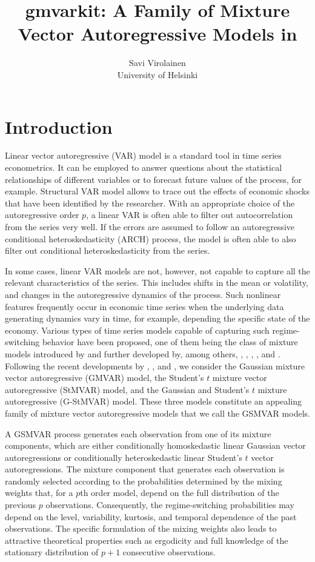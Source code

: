 \documentclass[nojss]{jss} %
\author{Savi Virolainen\\ University of Helsinki}
\title{gmvarkit: A Family of Mixture Vector Autoregressive Models in \proglang{R}}
\begin{document}
\section{Introduction}
Linear vector autoregressive (VAR) model is a standard tool in time series econometrics. It can be employed to answer questions about the statistical relationships of different variables or to forecast future values of the process, for example. Structural VAR model allows to trace out the effects of economic shocks that have been identified by the researcher. With an appropriate choice of the autoregressive order $p$, a linear VAR is often able to filter out autocorrelation from the series very well. If the errors are assumed to follow an autoregressive conditional heteroskedasticity (ARCH) process, the model is often able to also filter out conditional heteroskedasticity from the series.

In some cases, linear VAR models are not, however, not capable to capture all the relevant characteristics of the series. This includes shifts in the mean or volatility, and changes in the autoregressive dynamics of the process. Such nonlinear features frequently occur in economic time series when the underlying data generating dynamics vary in time, for example, depending the specific state of the economy. Various types of time series models capable of capturing such regime-switching behavior have been proposed, one of them being the class of mixture models introduced by \cite{Le+Martin+Raftery:1996} and further developed by, among others, \cite{Kalliovirta+Meitz+Saikkonen:2015}, \cite{Kalliovirta+Meitz+Saikkonen:2015}, \cite{Meitz+Preve+Saikkonen:2021}, \cite{Virolainen:2020}, and \cite{Virolainen:2021, Virolainen2:2021}. Following the recent developments by \cite{Kalliovirta+Meitz+Saikkonen:2016}, \cite{Virolainen:2020}, and \cite{Virolainen2:2021}, we consider the Gaussian mixture vector autoregressive (GMVAR) model, the Student's $t$ mixture vector autoregressive (StMVAR) model, and the Gaussian and Student's $t$ mixture autoregressive (G-StMVAR) model. These three models constitute an appealing family of mixture vector autoregressive models that we call the GSMVAR models.

A GSMVAR process generates each observation from one of its mixture components, which are either conditionally homoskedastic linear Gaussian vector autoregressions or conditionally heteroskedastic linear Student's $t$ vector autoregressions. The mixture component that generates each observation is randomly selected according to the probabilities determined by the mixing weights that, for a $p$th order model, depend on the full distribution of the previous $p$ observations. Consequently, the regime-switching probabilities may depend on the level, variability, kurtosis, and temporal dependence of the past observations. The specific formulation of the mixing weights also leads to attractive theoretical properties such as ergodicity and full knowledge of the stationary distribution of $p+1$ consecutive observations.
\end{document}
